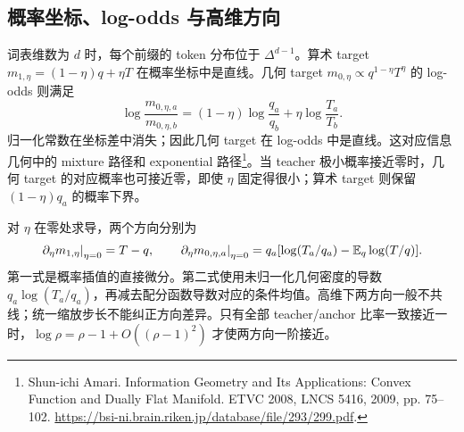 \subsection{概率坐标、log-odds 与高维方向}

词表维数为 $d$ 时，每个前缀的 token 分布位于 $\Delta^{d-1}$。算术 target $m_{1,\eta}=(1-\eta)q+\eta T$ 在概率坐标中是直线。几何 target $m_{0,\eta}\propto q^{1-\eta}T^\eta$ 的 log-odds 则满足
\begin{equation}
 \log\frac{m_{0,\eta,a}}{m_{0,\eta,b}}
 =(1-\eta)\log\frac{q_a}{q_b}+\eta\log\frac{T_a}{T_b}.
\end{equation}
归一化常数在坐标差中消失；因此几何 target 在 log-odds 中是直线。这对应信息几何中的 mixture 路径和 exponential 路径\footnote{Shun-ichi Amari. Information Geometry and Its Applications: Convex Function and Dually Flat Manifold. ETVC 2008, LNCS 5416, 2009, pp. 75--102. \url{https://bsi-ni.brain.riken.jp/database/file/293/299.pdf}.}。当 teacher 极小概率接近零时，几何 target 的对应概率也可接近零，即使 $\eta$ 固定得很小；算术 target 则保留 $(1-\eta)q_a$ 的概率下界。

对 $\eta$ 在零处求导，两个方向分别为
\begin{equation}
 \left.\partial_\eta m_{1,\eta}\right|_{\eta=0}=T-q,\qquad
 \left.\partial_\eta m_{0,\eta,a}\right|_{\eta=0}
 =q_a[\log(T_a/q_a)-\mathbb E_q\log(T/q)].
\end{equation}
第一式是概率插值的直接微分。第二式使用未归一化几何密度的导数 $q_a\log(T_a/q_a)$，再减去配分函数导数对应的条件均值。高维下两方向一般不共线；统一缩放步长不能纠正方向差异。只有全部 teacher/anchor 比率一致接近一时，$\log\rho=\rho-1+O((\rho-1)^2)$ 才使两方向一阶接近。
